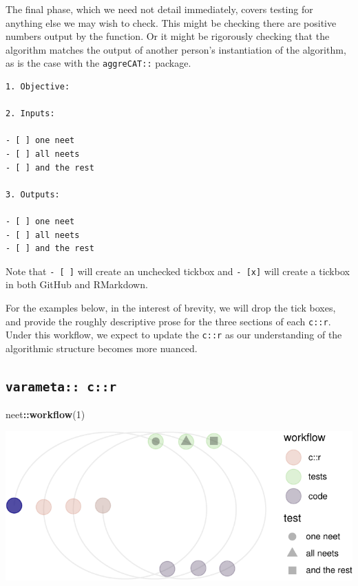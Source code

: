 \documentclass[
]{article}
\newenvironment{Shaded}{\begin{snugshade}}{\end{snugshade}}
\newcommand{\DecValTok}[1]{\textcolor[rgb]{0.00,0.00,0.81}{#1}}
\newcommand{\KeywordTok}[1]{\textcolor[rgb]{0.13,0.29,0.53}{\textbf{#1}}}
\newcommand{\NormalTok}[1]{#1}
\newcommand{\OperatorTok}[1]{\textcolor[rgb]{0.81,0.36,0.00}{\textbf{#1}}}
\begin{document}
The final phase, which we need not detail immediately, covers testing
for anything else we may wish to check. This might be checking there are
positive numbers output by the function. Or it might be rigorously
checking that the algorithm matches the output of another person's
instantiation of the algorithm, as is the case with the
\texttt{aggreCAT::} package.

\begin{verbatim}
1. Objective:

2. Inputs:

- [ ] one neet
- [ ] all neets
- [ ] and the rest

3. Outputs:

- [ ] one neet
- [ ] all neets
- [ ] and the rest
\end{verbatim}

Note that \texttt{-\ {[}\ {]}} will create an unchecked tickbox and
\texttt{-\ {[}x{]}} will create a tickbox in both GitHub and RMarkdown.

For the examples below, in the interest of brevity, we will drop the
tick boxes, and provide the roughly descriptive prose for the three
sections of each \texttt{c::r}. Under this workflow, we expect to update
the \texttt{c::r} as our understanding of the algorithmic structure
becomes more nuanced.

\hypertarget{varameta-cr}{%
\subsection{\texorpdfstring{\texttt{varameta::\ c::r}}{varameta:: c::r}}\label{varameta-cr}}

\begin{Shaded}
\begin{Highlighting}[]
\NormalTok{neet}\OperatorTok{::}\KeywordTok{workflow}\NormalTok{(}\DecValTok{1}\NormalTok{)}
\end{Highlighting}
\end{Shaded}

\begin{center}\includegraphics{when-is-done-done_files/figure-latex/unnamed-chunk-4-1} \end{center}
\end{document}
